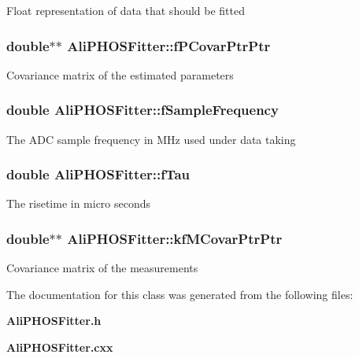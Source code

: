 Float representation of data that should be fitted 
\subsubsection{\setlength{\rightskip}{0pt plus 5cm}double$\ast$$\ast$ {\bf Ali\-PHOSFitter::f\-PCovar\-Ptr\-Ptr}\hspace{0.3cm}{\tt  [private]}}\label{classAliPHOSFitter_r8}


Covariance matrix of the estimated parameters 
\subsubsection{\setlength{\rightskip}{0pt plus 5cm}double {\bf Ali\-PHOSFitter::f\-Sample\-Frequency}\hspace{0.3cm}{\tt  [private]}}\label{classAliPHOSFitter_r1}


The ADC sample frequency in MHz used under data taking 
\subsubsection{\setlength{\rightskip}{0pt plus 5cm}double {\bf Ali\-PHOSFitter::f\-Tau}\hspace{0.3cm}{\tt  [private]}}\label{classAliPHOSFitter_r2}


The risetime in micro seconds 
\subsubsection{\setlength{\rightskip}{0pt plus 5cm}double$\ast$$\ast$ {\bf Ali\-PHOSFitter::kf\-MCovar\-Ptr\-Ptr}\hspace{0.3cm}{\tt  [private]}}\label{classAliPHOSFitter_r7}


Covariance matrix of the measurements 

The documentation for this class was generated from the following files:\begin{CompactItemize}
\item 
{\bf Ali\-PHOSFitter.h}\item 
{\bf Ali\-PHOSFitter.cxx}\end{CompactItemize}
